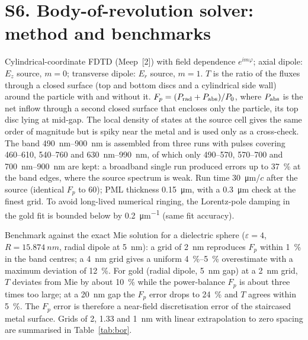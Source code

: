 \documentclass[11pt,a4paper]{article}
\begin{document}
\section*{S6. Body-of-revolution solver: method and benchmarks}
Cylindrical-coordinate FDTD (Meep~[2]) with field dependence $e^{im\varphi}$; axial dipole: $E_z$ source, $m=0$;
transverse dipole: $E_r$ source, $m=1$. $T$ is the ratio of the fluxes through a closed surface (top and bottom discs and a cylindrical side wall) around
the particle with and without it. $F_p=(P_{\rm rad}+P_{\rm abs})/P_0$, where $P_{\rm abs}$ is the net inflow through a
second closed surface that encloses only the particle, its top disc lying at mid-gap. The local density of states
at the source cell gives the same order of magnitude but is spiky near the metal and is used only as a cross-check. The band
\SIrange{490}{900}{nm} is assembled from three runs with pulses covering \SIrange{460}{610}{}, \SIrange{540}{760}{}
and \SIrange{630}{990}{nm}, of which only \SIrange{490}{570}{}, \SIrange{570}{700}{} and \SIrange{700}{900}{nm} are
kept: a broadband single run produced errors up to \SI{37}{\percent} at the band edges, where the source spectrum
is weak. Run time 30~\si{\micro\metre}/$c$ after the source (identical $F_p$ to 60); PML thickness
\SI{0.15}{\micro\metre}, with a \SI{0.3}{\micro\metre} check at the finest grid. To avoid long-lived numerical ringing,
the Lorentz-pole damping in the gold fit is bounded below by \SI{0.2}{\micro\metre^{-1}} (same fit accuracy).

Benchmark against the exact Mie solution for a dielectric sphere ($\varepsilon=4$, $R=\SI{15.874}{nm}$, radial dipole
at \SI{5}{nm}): a grid of \SI{2}{nm} reproduces $F_p$ within \SI{1}{\percent} in the band centres; a \SI{4}{nm} grid
gives a uniform \SIrange{4}{5}{\percent} overestimate with a maximum deviation of \SI{12}{\percent}. For gold (radial dipole, \SI{5}{nm} gap) at a \SI{2}{nm} grid, $T$ deviates from Mie by about
\SI{10}{\percent} while the power-balance $F_p$ is about three times too large; at a \SI{20}{nm} gap the $F_p$
error drops to \SI{24}{\percent} and $T$ agrees within \SI{5}{\percent}. The $F_p$ error is therefore a near-field
discretisation error of the staircased metal surface. Grids of 2, 1.33 and \SI{1}{nm} with linear extrapolation to
zero spacing are summarised in Table~\ref{tab:bor}.
\end{document}
